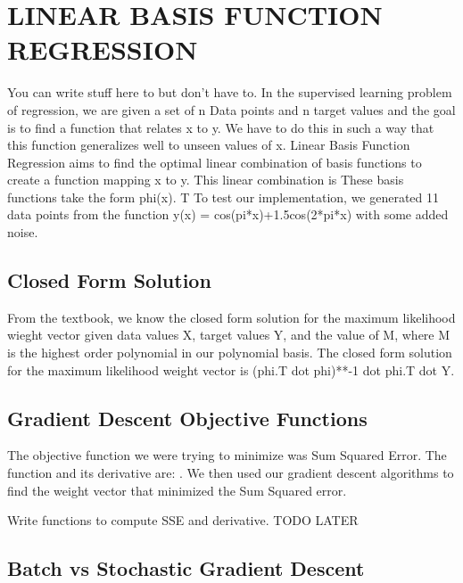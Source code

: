 \documentclass[a4paper,twoside]{article}
\begin{document}
\section{\uppercase{Linear Basis Function Regression}}

You can write stuff here to but don't have to. In the supervised learning problem of regression, we are given a set of n Data points and n target values and the goal is to find a function that relates x to y. We have to do this in such a way that this function generalizes well to unseen values of x. Linear Basis Function Regression aims to find the optimal linear combination of basis functions to create a function mapping x to y. This linear combination is These basis functions take the form phi(x). T To test our implementation, we generated 11 data points from the function y(x) = cos(pi*x)+1.5cos(2*pi*x) with some added noise. 

\subsection{Closed Form Solution}

From the textbook, we know the closed form solution for the maximum likelihood wieght vector given data values X, target values Y, and the value of M, where M is the highest order polynomial in our polynomial basis. The closed form solution for the maximum likelihood weight vector is (phi.T dot phi)**-1 dot phi.T dot Y. 

\subsection{Gradient Descent Objective Functions}

The objective function we were trying to minimize was Sum Squared Error. The function and its derivative are: . We then used our gradient descent algorithms to find the weight vector that minimized the Sum Squared error. 

Write functions to compute SSE and derivative. TODO LATER

\subsection{Batch vs Stochastic Gradient Descent}
\end{document}

